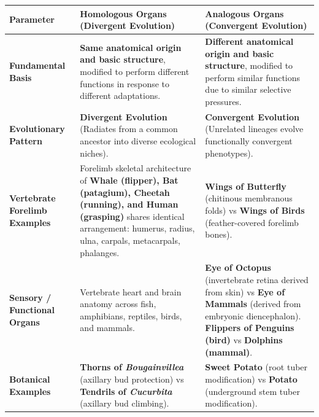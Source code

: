 \documentclass[10pt,a4paper]{article}
\begin{document}
\begin{conceptbox}
\begin{center}
\scriptsize
\begin{tabular}{|p{2.5cm}|p{6.0cm}|p{6.0cm}|}
\hline
\textbf{Parameter} & \textbf{Homologous Organs (Divergent Evolution)} & \textbf{Analogous Organs (Convergent Evolution)} \\
\hline
\textbf{Fundamental Basis} & \textbf{Same anatomical origin and basic structure}, modified to perform different functions in response to different adaptations. & \textbf{Different anatomical origin and basic structure}, modified to perform similar functions due to similar selective pressures. \\
\hline
\textbf{Evolutionary Pattern} & \textbf{Divergent Evolution} (Radiates from a common ancestor into diverse ecological niches). & \textbf{Convergent Evolution} (Unrelated lineages evolve functionally convergent phenotypes). \\
\hline
\textbf{Vertebrate Forelimb Examples} & Forelimb skeletal architecture of \textbf{Whale (flipper), Bat (patagium), Cheetah (running), and Human (grasping)} shares identical arrangement: humerus, radius, ulna, carpals, metacarpals, phalanges. & \textbf{Wings of Butterfly} (chitinous membranous folds) vs \textbf{Wings of Birds} (feather-covered forelimb bones). \\
\hline
\textbf{Sensory / Functional Organs} & Vertebrate heart and brain anatomy across fish, amphibians, reptiles, birds, and mammals. & \textbf{Eye of Octopus} (invertebrate retina derived from skin) vs \textbf{Eye of Mammals} (derived from embryonic diencephalon). \textbf{Flippers of Penguins (bird)} vs \textbf{Dolphins (mammal)}. \\
\hline
\textbf{Botanical Examples} & \textbf{Thorns of \textit{Bougainvillea}} (axillary bud protection) vs \textbf{Tendrils of \textit{Cucurbita}} (axillary bud climbing). & \textbf{Sweet Potato} (root tuber modification) vs \textbf{Potato} (underground stem tuber modification). \\
\hline
\end{tabular}
\end{center}
\end{conceptbox}
\end{document}
